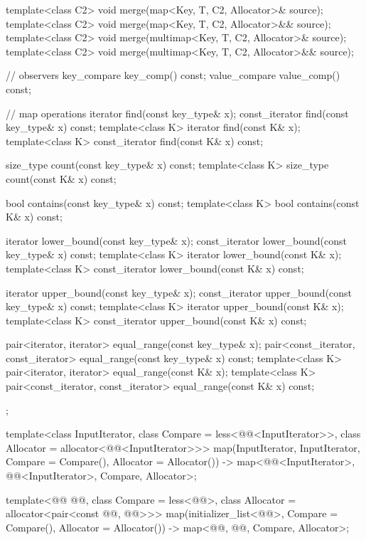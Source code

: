 \documentclass{wg21}
\begin{document}
\begin{codeblock}
{{        template<class C2>
        void merge(map<Key, T, C2, Allocator>& source);
        template<class C2>
        void merge(map<Key, T, C2, Allocator>&& source);
        template<class C2>
        void merge(multimap<Key, T, C2, Allocator>& source);
        template<class C2>
        void merge(multimap<Key, T, C2, Allocator>&& source);

        // observers
        key_compare key_comp() const;
        value_compare value_comp() const;

        // map operations
        iterator       find(const key_type& x);
        const_iterator find(const key_type& x) const;
        template<class K> iterator       find(const K& x);
        template<class K> const_iterator find(const K& x) const;

        size_type      count(const key_type& x) const;
        template<class K> size_type count(const K& x) const;

        bool           contains(const key_type& x) const;
        template<class K> bool contains(const K& x) const;

        iterator       lower_bound(const key_type& x);
        const_iterator lower_bound(const key_type& x) const;
        template<class K> iterator       lower_bound(const K& x);
        template<class K> const_iterator lower_bound(const K& x) const;

        iterator       upper_bound(const key_type& x);
        const_iterator upper_bound(const key_type& x) const;
        template<class K> iterator       upper_bound(const K& x);
        template<class K> const_iterator upper_bound(const K& x) const;

        pair<iterator, iterator>               equal_range(const key_type& x);
        pair<const_iterator, const_iterator>   equal_range(const key_type& x) const;
        template<class K>
        pair<iterator, iterator>             equal_range(const K& x);
        template<class K>
        pair<const_iterator, const_iterator> equal_range(const K& x) const;
    };

    template<class InputIterator, class Compare = less<@@<InputIterator>>,
    class Allocator = allocator<@@<InputIterator>>>
    map(InputIterator, InputIterator, Compare = Compare(), Allocator = Allocator())
    -> map<@@<InputIterator>, @@<InputIterator>, Compare, Allocator>;

    template<@@ @@, class Compare = less<@@>,
    class Allocator = allocator<pair<const @@,  @@>>>
    map(initializer_list<@@>, Compare = Compare(), Allocator = Allocator())
    -> map<@@, @@, Compare, Allocator>;

}
\end{codeblock}
\end{document}
